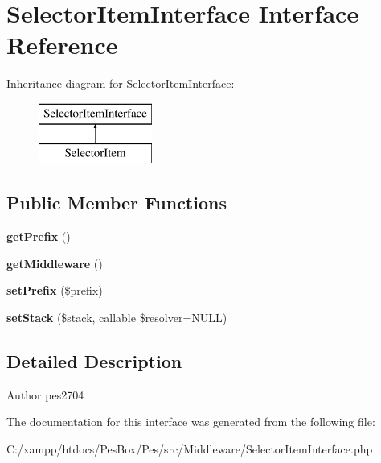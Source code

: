 \hypertarget{interface_pes_1_1_middleware_1_1_selector_item_interface}{}\section{Selector\+Item\+Interface Interface Reference}
\label{interface_pes_1_1_middleware_1_1_selector_item_interface}
Inheritance diagram for Selector\+Item\+Interface\+:\begin{figure}[H]
\begin{center}
\leavevmode
\includegraphics[height=2.000000cm]{interface_pes_1_1_middleware_1_1_selector_item_interface}
\end{center}
\end{figure}
\subsection*{Public Member Functions}
\begin{DoxyCompactItemize}
\item 
\mbox{\label{interface_pes_1_1_middleware_1_1_selector_item_interface_a7a333affb97cf092d50f3e59edaa9066}} 
{\bfseries get\+Prefix} ()
\item 
\mbox{\label{interface_pes_1_1_middleware_1_1_selector_item_interface_af09a4d42693ca813040ddf1ebb7a306f}} 
{\bfseries get\+Middleware} ()
\item 
\mbox{\label{interface_pes_1_1_middleware_1_1_selector_item_interface_a523b9bda674fc27df98f0da0b3f3276c}} 
{\bfseries set\+Prefix} (\$prefix)
\item 
\mbox{\label{interface_pes_1_1_middleware_1_1_selector_item_interface_a45338158e6ea2a7b58612339ccc85717}} 
{\bfseries set\+Stack} (\$stack, callable \$resolver=N\+U\+LL)
\end{DoxyCompactItemize}


\subsection{Detailed Description}
\begin{DoxyAuthor}{Author}
pes2704 
\end{DoxyAuthor}


The documentation for this interface was generated from the following file\+:\begin{DoxyCompactItemize}
\item 
C\+:/xampp/htdocs/\+Pes\+Box/\+Pes/src/\+Middleware/Selector\+Item\+Interface.\+php\end{DoxyCompactItemize}
